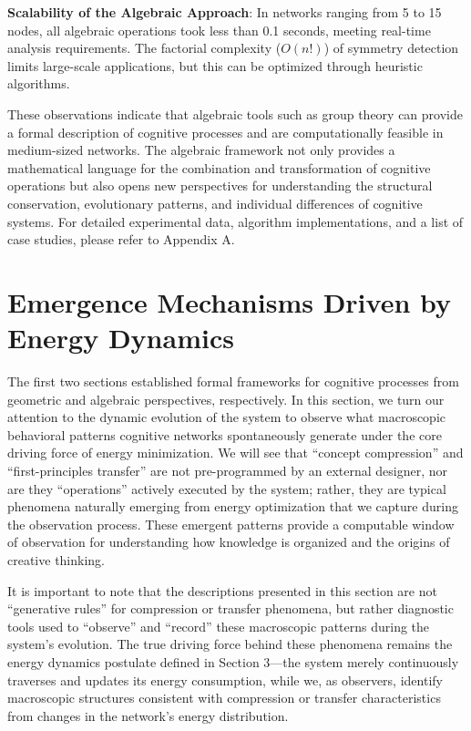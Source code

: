 \documentclass[10pt,onecolumn]{article}
\begin{document}
\textbf{Scalability of the Algebraic Approach}: In networks ranging from 5 to 15 nodes, all algebraic operations took less than 0.1 seconds, meeting real-time analysis requirements. The factorial complexity ($O(n!)$) of symmetry detection limits large-scale applications, but this can be optimized through heuristic algorithms.

These observations indicate that algebraic tools such as group theory can provide a formal description of cognitive processes and are computationally feasible in medium-sized networks. The algebraic framework not only provides a mathematical language for the combination and transformation of cognitive operations but also opens new perspectives for understanding the structural conservation, evolutionary patterns, and individual differences of cognitive systems. For detailed experimental data, algorithm implementations, and a list of case studies, please refer to Appendix A.

\section{Emergence Mechanisms Driven by Energy Dynamics}

The first two sections established formal frameworks for cognitive processes from geometric and algebraic perspectives, respectively. In this section, we turn our attention to the dynamic evolution of the system to observe what macroscopic behavioral patterns cognitive networks spontaneously generate under the core driving force of energy minimization. We will see that “concept compression” and “first-principles transfer” are not pre-programmed by an external designer, nor are they “operations” actively executed by the system; rather, they are typical phenomena naturally emerging from energy optimization that we capture during the observation process. These emergent patterns provide a computable window of observation for understanding how knowledge is organized and the origins of creative thinking.

It is important to note that the descriptions presented in this section are not “generative rules” for compression or transfer phenomena, but rather diagnostic tools used to “observe” and “record” these macroscopic patterns during the system’s evolution. The true driving force behind these phenomena remains the energy dynamics postulate defined in Section 3—the system merely continuously traverses and updates its energy consumption, while we, as observers, identify macroscopic structures consistent with compression or transfer characteristics from changes in the network’s energy distribution.
\end{document}
